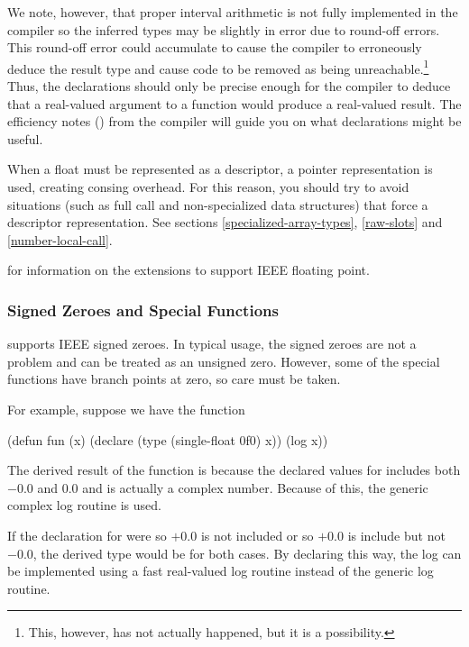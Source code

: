 We note, however, that proper interval arithmetic is not fully
implemented in the compiler so the inferred types may be slightly in
error due to round-off errors.  This round-off error could
accumulate to cause the compiler to erroneously deduce the result
type and cause code to be removed as being
unreachable.\footnote{This, however, has not actually happened, but
  it is a possibility.}%
Thus, the declarations should only be precise enough for the
compiler to deduce that a real-valued argument to a function would
produce a real-valued result.  The efficiency notes
() from the compiler will guide you
on what declarations might be useful.

When a float must be represented as a descriptor, a pointer representation is
used, creating consing overhead.  For this reason, you should try to avoid
situations (such as full call and non-specialized data structures) that force a
descriptor representation.  See sections \ref{specialized-array-types},
\ref{raw-slots} and \ref{number-local-call}.

 for information on the extensions to support IEEE
floating point.

\subsubsection{Signed Zeroes and Special Functions}

\cmucl{} supports IEEE signed zeroes.  In typical usage, the signed
zeroes are not a problem and can be treated as an unsigned zero.
However, some of the special functions have branch points at zero, so
care must be taken.

For example, suppose we have the function
\begin{example}
  (defun fun (x)
    (declare (type (single-float 0f0) x))
    (log x))
\end{example}
The derived result of the function is  because the declared values for
 includes both $-0.0$ and $0.0$ and  is
actually a complex number.  Because of this, the generic complex log
routine is used.

If the declaration for  were  so $+0.0$
is not included or  so
  $+0.0$ is include but not $-0.0$, the derived type would be
   for both cases.  By declaring  this way,
  the log can be implemented using a fast real-valued log routine
  instead of the generic log routine.

